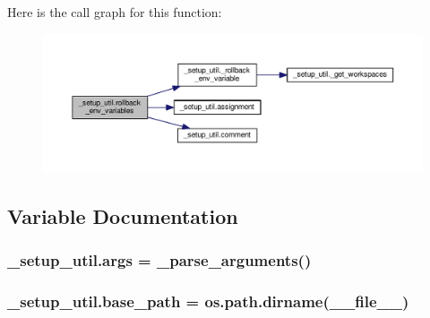 Here is the call graph for this function\+:\nopagebreak
\begin{figure}[H]
\begin{center}
\leavevmode
\includegraphics[width=350pt]{namespace__setup__util_af3030db6102b5aa35cd354a2fb6cca03_cgraph}
\end{center}
\end{figure}




\subsection{Variable Documentation}
\subsubsection[{\texorpdfstring{args}{args}}]{\setlength{\rightskip}{0pt plus 5cm}\+\_\+setup\+\_\+util.\+args = {\bf \+\_\+parse\+\_\+arguments}()}\hypertarget{namespace__setup__util_a547963d07c6371df1c51b1384a2dec28}{}\label{namespace__setup__util_a547963d07c6371df1c51b1384a2dec28}
\subsubsection[{\texorpdfstring{base\+\_\+path}{base_path}}]{\setlength{\rightskip}{0pt plus 5cm}\+\_\+setup\+\_\+util.\+base\+\_\+path = os.\+path.\+dirname(\+\_\+\+\_\+file\+\_\+\+\_\+)}\hypertarget{namespace__setup__util_a83d25140acd7788bbcb95843fe38e639}{}\label{namespace__setup__util_a83d25140acd7788bbcb95843fe38e639}
